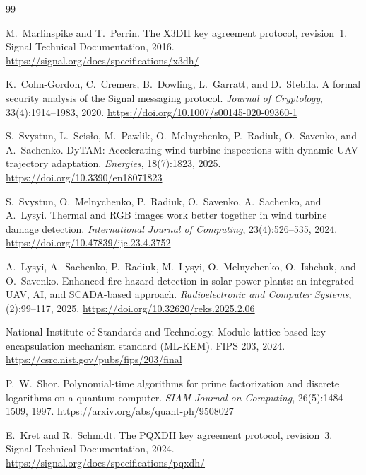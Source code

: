 \documentclass[preprint,12pt]{elsarticle}
\theoremstyle{definition}
\begin{document}

\begin{thebibliography}{99}

M.~Marlinspike and T.~Perrin.
\newblock The {X3DH} key agreement protocol, revision~1.
\newblock Signal Technical Documentation, 2016.
\newblock \url{https://signal.org/docs/specifications/x3dh/}

K.~Cohn-Gordon, C.~Cremers, B.~Dowling, L.~Garratt, and D.~Stebila.
\newblock A formal security analysis of the Signal messaging protocol.
\newblock \emph{Journal of Cryptology}, 33(4):1914--1983, 2020.
\newblock \url{https://doi.org/10.1007/s00145-020-09360-1}

S.~Svystun, L.~Scis{\l}o, M.~Pawlik, O.~Melnychenko, P.~Radiuk, O.~Savenko, and A.~Sachenko.
\newblock DyTAM: Accelerating wind turbine inspections with dynamic UAV trajectory adaptation.
\newblock \emph{Energies}, 18(7):1823, 2025.
\newblock \url{https://doi.org/10.3390/en18071823}

S.~Svystun, O.~Melnychenko, P.~Radiuk, O.~Savenko, A.~Sachenko, and A.~Lysyi.
\newblock Thermal and RGB images work better together in wind turbine damage detection.
\newblock \emph{International Journal of Computing}, 23(4):526--535, 2024.
\newblock \url{https://doi.org/10.47839/ijc.23.4.3752}

A.~Lysyi, A.~Sachenko, P.~Radiuk, M.~Lysyi, O.~Melnychenko, O.~Ishchuk, and O.~Savenko.
\newblock Enhanced fire hazard detection in solar power plants: an integrated UAV, AI, and SCADA-based approach.
\newblock \emph{Radioelectronic and Computer Systems}, (2):99--117, 2025.
\newblock \url{https://doi.org/10.32620/reks.2025.2.06}

National Institute of Standards and Technology.
\newblock Module-lattice-based key-encapsulation mechanism standard ({ML-KEM}).
\newblock FIPS 203, 2024.
\newblock \url{https://csrc.nist.gov/pubs/fips/203/final}

P.~W.~Shor.
\newblock Polynomial-time algorithms for prime factorization and discrete logarithms on a quantum computer.
\newblock \emph{SIAM Journal on Computing}, 26(5):1484--1509, 1997.
\newblock \url{https://arxiv.org/abs/quant-ph/9508027}

E.~Kret and R.~Schmidt.
\newblock The {PQXDH} key agreement protocol, revision~3.
\newblock Signal Technical Documentation, 2024.
\newblock \url{https://signal.org/docs/specifications/pqxdh/}


\end{thebibliography}
\end{document}
